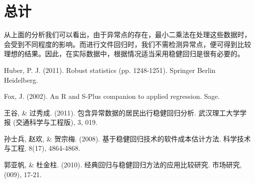 \documentclass[english]{article}\usepackage[]{graphicx}\usepackage[]{color}
\begin{document}
\section{总计}

从上面的分析我们可以看出，由于异常点的存在，最小二乘法在处理这些数据时，会受到不同程度的影响。而进行文件回归时，我们不需检测异常点，便可得到比较理想的结果。因此，在实际数据中，根据情况适当采用稳健回归是很有必要的。
\begin{thebibliography}{1}
Huber, P. J. (2011). Robust statistics (pp. 1248-1251).
Springer Berlin Heidelberg.

Fox, J. (2002). An R and S-Plus companion to applied
regression. Sage.

王谷, \& 过秀成. (2011). 包含异常数据的居民出行稳健回归分析. 武汉理工大学学报 (交通科学与工程版),
3, 019.

孙士兵, 赵欢, \& 贺宗梅. (2008). 基于稳健回归技术的软件成本估计方法. 科学技术与工程,
8(17), 4864-4868.

郭亚帆, \& 杜金柱. (2010). 经典回归与稳健回归方法的应用比较研究. 市场研究, (009),
17-21.\end{thebibliography}
\end{document}
